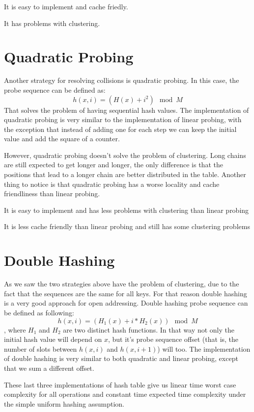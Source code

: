 \rightthumbsup It is easy to implement and cache friedly.

\rightthumbsdown It has problems with clustering.

\section{Quadratic Probing}

Another strategy for resolving collisions is quadratic probing. In this case, the probe sequence can be defined as:
\[ h(x, i) = (H(x) + i^2) \mod M \]
That solves the problem of having sequential hash values. The implementation of quadratic probing is very similar to the implementation of linear probing, with the exception that instead of adding one for each step we can keep the initial value and add the square of a counter.

However, quadratic probing doesn't solve the problem of clustering. Long chains are still expected to get longer and longer, the only difference is that the positions that lead to a longer chain are better distributed in the table. Another thing to notice is that quadratic probing has a worse locality and cache friendliness than linear probing. 

\rightthumbsup It is easy to implement and has less problems with clustering than linear probing

\rightthumbsdown It is less cache friendly than linear probing and still has some clustering problems

\section{Double Hashing}

As we saw the two strategies above have the problem of clustering, due to the fact that the sequences are the same for all keys. For that reason double hashing is a very good approach for open addressing. Double hashing probe sequence can be defined as following:
\[ h(x, i) = (H_1(x) + i * H_2(x)) \mod M \],
where \( H_1 \) and \( H_2 \) are two distinct hash functions. In that way not only the initial hash value will depend on \( x \), but it's probe sequence offset (that is, the number of slots between \(h(x, i) \) and \(h(x, i + 1) \)) will too. The implementation of double hashing is very similar to both quadratic and linear probing, except that we sum a different offset.

These last three implementations of hash table give us linear time worst case complexity for all operations and constant time expected time complexity under the simple uniform hashing assumption.

